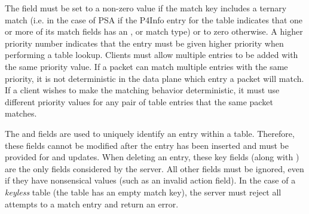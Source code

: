 \documentclass[11pt]{article}
\begin{document}
{%
\noindent{}The  field must be set to a non-zero value if the match key includes a
ternary match (i.e. in the case of PSA if the P4Info entry for the table
indicates that one or more of its match fields has an ,  or
 match
type) or to zero otherwise. A higher priority number indicates that the entry
must be given higher priority when performing a table lookup. Clients must allow
multiple entries to be added with the same priority value.  If a packet can
match multiple entries with the same priority, it is not deterministic in the
data plane which entry a packet will match.  If a client wishes to make the
matching behavior deterministic, it must use different priority values for any
pair of table entries that the same packet matches.%

The  and  fields are used to uniquely identify an entry within
a table. Therefore, these fields cannot be modified after the entry has been
inserted and must be provided for  and  updates. When deleting
an entry, these key fields (along with ) are the only fields
considered by the server. All other fields must be ignored, even if they have
nonsensical values (such as an invalid action field). In the case of a \emph{keyless}
table (the table has an empty match key), the server must reject all attempts to
 a match entry and return an  error.%

}
\end{document}
